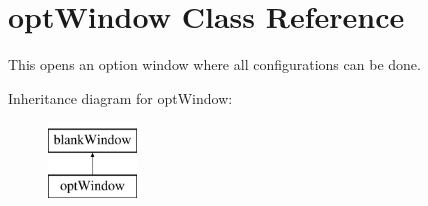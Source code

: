 \hypertarget{classgui_1_1window2_1_1optWindow}{\section{opt\-Window \-Class \-Reference}
\label{classgui_1_1window2_1_1optWindow}
}


\-This opens an option window where all configurations can be done.  


\-Inheritance diagram for opt\-Window\-:\begin{figure}[H]
\begin{center}
\leavevmode
\includegraphics[height=2.000000cm]{classgui_1_1window2_1_1optWindow}
\end{center}
\end{figure}
